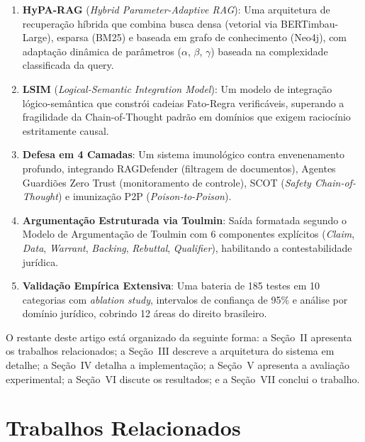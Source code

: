 \documentclass[journal,10pt]{IEEEtran}
\begin{document}
\begin{enumerate}    \item \textbf{HyPA-RAG} (\textit{Hybrid Parameter-Adaptive RAG}): Uma arquitetura de recupera\c{c}\~{a}o h\'{i}brida que combina busca densa (vetorial via BERTimbau-Large), esparsa (BM25) e baseada em grafo de conhecimento (Neo4j), com adapta\c{c}\~{a}o din\^{a}mica de par\^{a}metros ($\alpha$, $\beta$, $\gamma$) baseada na complexidade classificada da query.

    \item \textbf{LSIM} (\textit{Logical-Semantic Integration Model}): Um modelo de integra\c{c}\~{a}o l\'{o}gico-sem\^{a}ntica que constr\'{o}i cadeias Fato-Regra verific\'{a}veis, superando a fragilidade da Chain-of-Thought padr\~{a}o em dom\'{i}nios que exigem racioc\'{i}nio estritamente causal.

    \item \textbf{Defesa em 4 Camadas}: Um sistema imunol\'{o}gico contra envenenamento profundo, integrando RAGDefender (filtragem de documentos), Agentes Guardi\~{o}es Zero Trust (monitoramento de controle), SCOT (\textit{Safety Chain-of-Thought}) e imuniza\c{c}\~{a}o P2P (\textit{Poison-to-Poison}).

    \item \textbf{Argumenta\c{c}\~{a}o Estruturada via Toulmin}: Sa\'{i}da formatada segundo o Modelo de Argumenta\c{c}\~{a}o de Toulmin com 6 componentes expl\'{i}citos (\textit{Claim}, \textit{Data}, \textit{Warrant}, \textit{Backing}, \textit{Rebuttal}, \textit{Qualifier}), habilitando a contestabilidade jur\'{i}dica.

    \item \textbf{Valida\c{c}\~{a}o Emp\'{i}rica Extensiva}: Uma bateria de 185 testes em 10 categorias com \textit{ablation study}, intervalos de confian\c{c}a de 95\% e an\'{a}lise por dom\'{i}nio jur\'{i}dico, cobrindo 12 \'{a}reas do direito brasileiro.
\end{enumerate}

O restante deste artigo est\'{a} organizado da seguinte forma: a Se\c{c}\~{a}o~II apresenta os trabalhos relacionados; a Se\c{c}\~{a}o~III descreve a arquitetura do sistema em detalhe; a Se\c{c}\~{a}o~IV detalha a implementa\c{c}\~{a}o; a Se\c{c}\~{a}o~V apresenta a avalia\c{c}\~{a}o experimental; a Se\c{c}\~{a}o~VI discute os resultados; e a Se\c{c}\~{a}o~VII conclui o trabalho.

\section{Trabalhos Relacionados}
\end{document}
